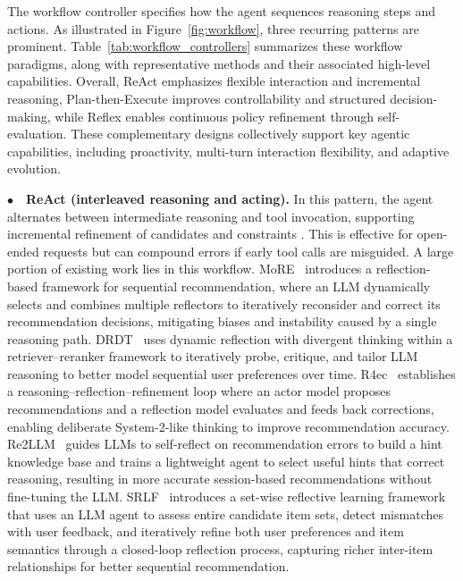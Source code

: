 {The workflow controller specifies how the agent sequences reasoning steps and actions. As illustrated in Figure~\ref{fig:workflow}, three recurring patterns are prominent.}
Table~\ref{tab:workflow_controllers} summarizes these workflow paradigms, along with representative methods and their associated high-level capabilities. 
Overall, ReAct emphasizes flexible interaction and incremental reasoning, Plan-then-Execute improves controllability and structured decision-making, while Reflex enables continuous policy refinement through self-evaluation. 
These complementary designs collectively support key agentic capabilities, including proactivity, multi-turn interaction flexibility, and adaptive evolution.



\noindent$\bullet\quad$\textbf{ReAct (interleaved reasoning and acting).}
{In this pattern, the agent alternates between intermediate reasoning and tool invocation, supporting incremental refinement of candidates and constraints \cite{yao2022react}. This is effective for open-ended requests but can compound errors if early tool calls are misguided.} 
{
A large portion of existing work lies in this workflow. MoRE~\cite{more} introduces a reflection-based framework for sequential recommendation, where an LLM dynamically selects and combines multiple reflectors to iteratively reconsider and correct its recommendation decisions, mitigating biases and instability caused by a single reasoning path. DRDT~\cite{drdt} uses dynamic reflection with divergent thinking within a retriever–reranker framework to iteratively probe, critique, and tailor LLM reasoning to better model sequential user preferences over time.
R4ec~\cite{gu2025r} establishes a reasoning–reflection–refinement loop where an actor model proposes recommendations and a reflection model evaluates and feeds back corrections, enabling deliberate System-2-like thinking to improve recommendation accuracy. Re2LLM~\cite{re2llm} guides LLMs to self-reflect on recommendation errors to build a hint knowledge base and trains a lightweight agent to select useful hints that correct reasoning, resulting in more accurate session-based recommendations without fine-tuning the LLM. SRLF~\cite{srlf} introduces a set-wise reflective learning framework that uses an LLM agent to assess entire candidate item sets, detect mismatches with user feedback, and iteratively refine both user preferences and item semantics through a closed-loop reflection process, capturing richer inter-item relationships for better sequential recommendation. 
}


